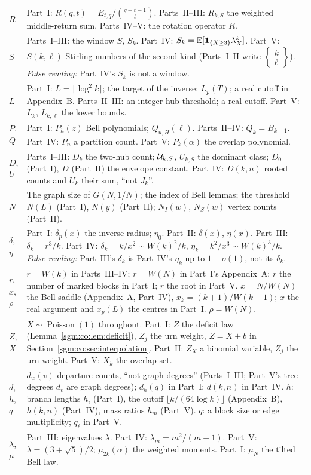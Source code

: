 \documentclass[11pt,letterpaper]{article}
\theoremstyle{remark}\newtheorem{remark}[theorem]{Remark}
\newcommand{\Poi}{\operatorname{Poisson}}\newcommand{\Bin}{\operatorname{Bin}}
\newcommand{\Stir}[2]{\left\{\begin{matrix}#1\\#2\end{matrix}\right\}}
\theoremstyle{definition}\newtheorem{definition}[theorem]{Definition}
\begin{document}
\begin{longtable}{@{}>{\raggedright\arraybackslash}p{0.75in}>{\raggedright\arraybackslash}p{5.5in}@{}}
$R$ & Part~I: $R(q,t)=E_{t,q}/\binom{q+t-1}t$. Parts~II--III: $R_{k,S}$ the weighted middle-return sum. Parts~IV--V: the rotation operator $R$.\\
$S$ & Parts~I--III: the window $S$, $S_k$. Part~IV: $S_k=\mathbb E[\mathbf 1_{\{X\ge3\}}\lambda_X^k]$. Part~V: $S(k,\ell)$ Stirling numbers of the second kind (Parts~I--II write $\Stir k\ell$). \emph{False reading:} Part~IV's $S_k$ is not a window.\\
$L$ & Part~I: $L=\lceil\log^2k\rceil$; the target of the inverse; $L_p(T)$; a real cutoff in Appendix~B. Parts~II--III: an integer hub threshold; a real cutoff. Part~V: $L_k$, $L_{k,\ell}$ the lower bounds.\\
$P$, $Q$ & Part~I: $P_h(z)$ Bell polynomials; $Q_{u,H}(\ell)$. Parts~II--IV: $Q_k=B_{k+1}$. Part~IV: $P_n$ a partition count. Part~V: $P_k(\alpha)$ the overlap polynomial.\\
$D$, $U$ & Parts~I--III: $D_k$ the two-hub count; $\mathcal U_{k,S}$, $U_{k,S}$ the dominant class; $D_0$ (Part~I), $D$ (Part~II) the envelope constant. Part~IV: $D(k,n)$ rooted counts and $U_k$ their sum, ``not $J_k$''.\\
$N$ & The graph size of $G(N,1/N)$; the index of Bell lemmas; the threshold $N(L)$ (Part~I), $N(y)$ (Part~II); $N_I(w)$, $N_S(w)$ vertex counts (Part~II).\\
$\delta$, $\eta$ & Part~I: $\delta_p(x)$ the inverse radius; $\eta_0$. Part~II: $\delta(x)$, $\eta(x)$. Part~III: $\delta_k=r^3/k$. Part~IV: $\delta_k=k/x^2\sim W(k)^2/k$, $\eta_k=k^2/x^3\sim W(k)^3/k$. \emph{False reading:} Part~III's $\delta_k$ is Part~IV's $\eta_k$ up to $1+o(1)$, not its $\delta_k$.\\
$r$, $x$, $\rho$ & $r=W(k)$ in Parts~III--IV; $r=W(N)$ in Part~I's Appendix~A; $r$ the number of marked blocks in Part~I; $r$ the root in Part~V. $x=N/W(N)$ the Bell saddle (Appendix~A, Part~IV), $x_k=(k+1)/W(k+1)$; $x$ the real argument and $x_p(L)$ the centres in Part~I. $\rho=W(N)$.\\
$Z$, $X$ & $X\sim\Poi(1)$ throughout. Part~I: $Z$ the deficit law (Lemma~\ref{sgm:co:lem:deficit}), $Z_j$ the urn weight, $Z=X+b$ in Section~\ref{sgm:co:sec:interpolation}. Part~II: $Z_X$ a binomial variable, $Z_j$ the urn weight. Part~V: $X_k$ the overlap set.\\
$d$, $h$, $q$ & $d_w(v)$ departure counts, ``not graph degrees'' (Parts~I--III; Part~V's tree degrees $d_v$ are graph degrees); $d_h(q)$ in Part~I; $d(k,n)$ in Part~IV. $h$: branch lengths $h_i$ (Part~I), the cutoff $\lfloor k/(64\log k)\rfloor$ (Appendix~B), $h(k,n)$ (Part~IV), mass ratios $h_m$ (Part~V). $q$: a block size or edge multiplicity; $q_\ell$ in Part~V.\\
$\lambda$, $\mu$ & Part~III: eigenvalues $\lambda$. Part~IV: $\lambda_m=m^2/(m-1)$. Part~V: $\lambda=(3+\sqrt5)/2$; $\mu_{2k}(\alpha)$ the weighted moments. Part~I: $\mu_N$ the tilted Bell law.\\
\bottomrule
\end{longtable}\addtocounter{table}{-1}%
\endgroup
\end{document}
